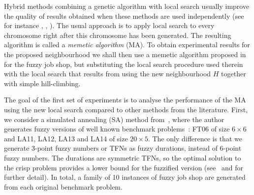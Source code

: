 \documentclass[letterpaper]{article}
\begin{document}
Hybrid methods combining a genetic algorithm with local search usually improve the quality of results obtained when these methods are used independently (see for instance \cite{Ishibuchi1998}, \cite{GonzalezRodriguez2007b}, \cite{Vela2008}). The usual approach is to apply local search to every chromosome right after this chromosome has been generated. The resulting algorithm is called a \emph{memetic algorithm} (MA). To obtain experimental results for the proposed neighbourhood we shall then use a memetic algorithm proposed in \cite{GonzalezRodriguez2007b} for the fuzzy job shop, but substituting the local search procedure used therein with the local search that results from using the new neighbourhood $H$ together with simple hill-climbing.

The goal of the first set of experiments is to analyse the performance of the MA using the new local search compared to other methods from the literature. First, we consider a simulated annealing (SA) method from~\cite{Fortemps1997}, where the author generates fuzzy versions of well known benchmark problems~\cite{Applegate1991}: FT06 of size $6\times6$ and LA11, LA12, LA13 and LA14 of size $20 \times 5$. The only difference is that we generate 3-point fuzzy numbers or TFNs as fuzzy durations, instead of 6-point fuzzy numbers. The durations are symmetric TFNs, so the optimal solution to the crisp problem provides a lower bound for the fuzzified version (see~\cite{Fortemps1997} and \cite{GonzalezRodriguez2007b} for further detail). In total, a family of 10 instances of fuzzy job shop are generated from each original benchmark problem.
\end{document}
